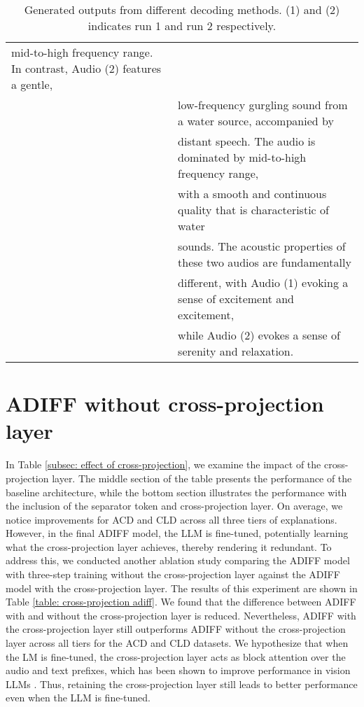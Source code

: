 \begin{table}
{\begin{tabular}{ll}
mid-to-high frequency range. In contrast, Audio (2) features a gentle, \\&
low-frequency gurgling sound from a water source, accompanied by \\&
distant speech. The audio is dominated by mid-to-high frequency range, \\&
with a smooth and continuous quality that is characteristic of water \\&
sounds. The acoustic properties of these two audios are fundamentally \\&
different, with Audio (1) evoking a sense of excitement and excitement, \\&
while Audio (2) evokes a sense of serenity and relaxation. \\
\bottomrule
\end{tabular}}
\caption{\small Generated outputs from different decoding methods. (1) and (2) indicates run 1 and run 2 respectively.}
\label{tab:gendiversity}
\end{table}

\vspace{-0.1in}
\section{ADIFF without cross-projection layer} \vspace{-0.1in}
In Table \ref{subsec: effect of cross-projection}, we examine the impact of the cross-projection layer. The middle section of the table presents the performance of the baseline architecture, while the bottom section illustrates the performance with the inclusion of the separator token and cross-projection layer. On average, we notice improvements for ACD and CLD across all three tiers of explanations. However, in the final ADIFF model, the LLM is fine-tuned, potentially learning what the cross-projection layer achieves, thereby rendering it redundant. To address this, we conducted another ablation study comparing the ADIFF model with three-step training without the cross-projection layer against the ADIFF model with the cross-projection layer. The results of this experiment are shown in Table \ref{table: cross-projection adiff}. We found that the difference between ADIFF with and without the cross-projection layer is reduced. Nevertheless, ADIFF with the cross-projection layer still outperforms ADIFF without the cross-projection layer across all tiers for the ACD and CLD datasets. We hypothesize that when the LM is fine-tuned, the cross-projection layer acts as block attention over the audio and text prefixes, which has been shown to improve performance in vision LLMs \cite{beyer2024paligemma}. Thus, retaining the cross-projection layer still leads to better performance even when the LLM is fine-tuned.

